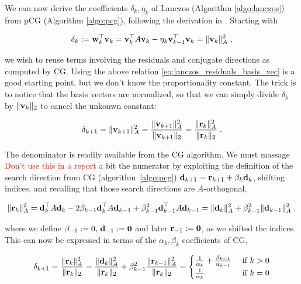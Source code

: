 \documentclass{article}
\begin{document}
{We can now derive the coefficients $\delta_k, \eta_k$ of Lanczos (Algorithm \ref{algo:lanczos}) from pCG (Algorithm \ref{algo:pcg}), following the derivation in \cite[section 6.7.3]{saad_iterative_2003}. Starting with 

\begin{equation*}
    \delta_k := \boldsymbol{\mathbf{w}}_k^\top \boldsymbol{\mathbf{v}}_k = \boldsymbol{\mathbf{v}}_k^\top A \boldsymbol{\mathbf{v}}_k - \eta_k \boldsymbol{\mathbf{v}}_{k-1}^\top \boldsymbol{\mathbf{v}}_k = \Vert \boldsymbol{\mathbf{v}}_k \Vert_A^2 \; ,
\end{equation*}

we wish to reuse terms involving the residuals and conjugate directions as computed by CG. Using the above relation \eqref{eq:lanczos_residuals_basis_vec} is a good starting point, but we don't know the proportionality constant. The trick is to notice that the basis vectors are normalized, so that we can simply divide $\delta_k$ by $\Vert \boldsymbol{\mathbf{v}}_k \Vert_2$ to cancel the unkonwn constant:

\begin{equation*}
    \delta_{k+1} = \Vert \boldsymbol{\mathbf{v}}_{k+1} \Vert_A^2 = \frac{\Vert \boldsymbol{\mathbf{v}}_{k+1} \Vert_A^2}{\Vert \boldsymbol{\mathbf{v}}_{k+1} \Vert_2} = \frac{\Vert \boldsymbol{\mathbf{r}}_{k} \Vert_A^2}{\Vert \boldsymbol{\mathbf{r}}_k \Vert_2} \; .
\end{equation*}

The denominator is readily available from the CG algorithm. We must massage \textcolor{red}{Don't use this in a report} a bit the numerator by exploiting the definition of the search direction from CG (algorithm~\ref{algo:pcg}) $\boldsymbol{\mathbf{d}}_{k+1} = \boldsymbol{\mathbf{r}}_{k+1} + \beta_k \boldsymbol{\mathbf{d}}_k$, shifting indices, and recalling that those search directions are $A$-orthogonal,

\begin{equation*}
    \Vert \boldsymbol{\mathbf{r}}_{k} \Vert_A^2 = \boldsymbol{\mathbf{d}}_k^\top A \boldsymbol{\mathbf{d}}_k - 2 \beta_{k-1} \boldsymbol{\mathbf{d}}_k^\top A \boldsymbol{\mathbf{d}}_{k-1} + \beta_{k-1}^2 \boldsymbol{\mathbf{d}}_{k-1}^\top A \boldsymbol{\mathbf{d}}_{k-1} = \Vert \boldsymbol{\mathbf{d}}_{k} \Vert_A^2 + \beta_{k-1}^2 \Vert \boldsymbol{\mathbf{d}}_{k-1} \Vert_A^2 \; ,
\end{equation*}

where we define $\beta_{-1}:= 0, \, \boldsymbol{\mathbf{d}}_{-1} := \boldsymbol{\mathbf{0}}$ and later $\boldsymbol{\mathbf{r}}_{-1} := \boldsymbol{\mathbf{0}}$, as we shifted the indices. This can now be expressed in terms of the $\alpha_k, \beta_k$ coefficients of CG, 

\begin{equation*}
    \delta_{k+1} = \frac{\Vert \boldsymbol{\mathbf{r}}_{k} \Vert_A^2}{\Vert \boldsymbol{\mathbf{r}}_k \Vert_2} = \frac{\Vert \boldsymbol{\mathbf{d}}_{k} \Vert_A^2}{\Vert \boldsymbol{\mathbf{r}}_k \Vert_2} + \beta_{k-1}^2 \frac{\Vert \boldsymbol{\mathbf{r}}_{k-1} \Vert_A^2}{\Vert \boldsymbol{\mathbf{r}}_k \Vert_2} = \begin{cases}
    \frac {1}{\alpha_k} + \frac{\beta_{k-1}}{\alpha_{k-1}} & \text{ if } k > 0\\
    \frac {1}{\alpha_k} & \text{ if } k = 0
    \end{cases}
\end{equation*}

}
\end{document}
